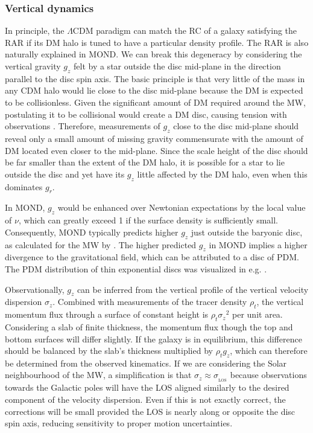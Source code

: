 \documentclass[fleqn,usenatbib,useAMS]{mnras} %
\begin{document}
\subsubsection{Vertical dynamics}
\label{Vertical_dynamics}

In principle, the $\Lambda$CDM paradigm can match the RC of a galaxy satisfying the RAR if its DM halo is tuned to have a particular density profile. The RAR is also naturally explained in MOND. We can break this degeneracy by considering the vertical gravity $g_z$ felt by a star outside the disc mid-plane in the direction parallel to the disc spin axis. The basic principle is that very little of the mass in any CDM halo would lie close to the disc mid-plane because the DM is expected to be collisionless. Given the significant amount of DM required around the MW, postulating it to be collisional would create a DM disc, causing tension with observations \citep*{Buch_2019}. Therefore, measurements of $g_z$ close to the disc mid-plane should reveal only a small amount of missing gravity commensurate with the amount of DM located even closer to the mid-plane. Since the scale height of the disc should be far smaller than the extent of the DM halo, it is possible for a star to lie outside the disc and yet have its $g_z$ little affected by the DM halo, even when this dominates $g_r$.

In MOND, $g_z$ would be enhanced over Newtonian expectations by the local value of $\nu$, which can greatly exceed 1 if the surface density is sufficiently small. Consequently, MOND typically predicts higher $g_z$ just outside the baryonic disc, as calculated for the MW by \citet{Bienayme_2009}. The higher predicted $g_z$ in MOND implies a higher divergence to the gravitational field, which can be attributed to a disc of PDM. The PDM distribution of thin exponential discs was visualized in e.g. \citet{Lughausen_2013, Lughausen_2015}.

Observationally, $g_z$ can be inferred from the vertical profile of the vertical velocity dispersion $\sigma_z$. Combined with measurements of the tracer density $\rho_t$, the vertical momentum flux through a surface of constant height is $\rho_t {\sigma_z}^2$ per unit area. Considering a slab of finite thickness, the momentum flux though the top and bottom surfaces will differ slightly. If the galaxy is in equilibrium, this difference should be balanced by the slab's thickness multiplied by $\rho_t g_z$, which can therefore be determined from the observed kinematics. If we are considering the Solar neighbourhood of the MW, a simplification is that $\sigma_z \approx \sigma_{_\text{LOS}}$ because observations towards the Galactic poles will have the LOS aligned similarly to the desired component of the velocity dispersion. Even if this is not exactly correct, the corrections will be small provided the LOS is nearly along or opposite the disc spin axis, reducing sensitivity to proper motion uncertainties.
\end{document}
